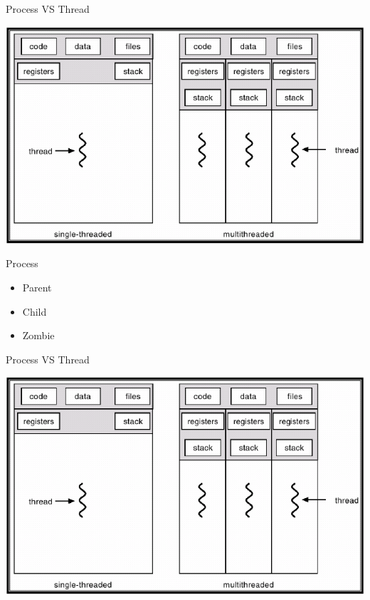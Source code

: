 
\begin{frame}{Process VS Thread}
  \begin{center}
    \includegraphics[width=\textwidth,keepaspectratio]{sources/images/threadmodel.png}
  \end{center}
\end{frame}

\begin{frame}{Process}
  \begin{center}
    \begin{itemize}
      \item Parent
      \item Child
      \item Zombie
      \end{itemize}
  \end{center}
\end{frame}

\begin{frame}{Process VS Thread}
  \begin{center}
    \includegraphics[width=\textwidth,keepaspectratio]{sources/images/threadmodel.png}
  \end{center}
\end{frame}

